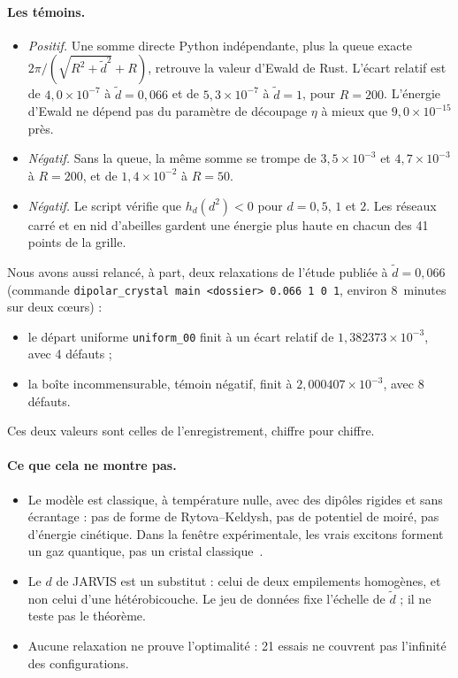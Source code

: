 \paragraph{Les témoins.}
\begin{itemize}
\item \emph{Positif.} Une somme directe Python indépendante, plus la queue exacte $2\pi/(\sqrt{R^2+\tilde
d^2}+R)$, retrouve la valeur d'Ewald de Rust. L'écart relatif est de $4{,}0\times10^{-7}$ à $\tilde d=0{,}066$ et
de $5{,}3\times10^{-7}$ à $\tilde d=1$, pour $R=200$. L'énergie d'Ewald ne dépend pas du paramètre de
découpage $\eta$ à mieux que $9{,}0\times10^{-15}$ près.
\item \emph{Négatif.} Sans la queue, la même somme se trompe de $3{,}5\times10^{-3}$ et $4{,}7\times10^{-3}$ à
$R=200$, et de $1{,}4\times10^{-2}$ à $R=50$.
\item \emph{Négatif.} Le script vérifie que $h_d(d^2)<0$ pour $d=0{,}5$, $1$ et $2$. Les réseaux carré et en nid
d'abeilles gardent une énergie plus haute en chacun des 41 points de la grille.
\end{itemize}
Nous avons aussi relancé, à part, deux relaxations de l'étude publiée à $\tilde d=0{,}066$ (commande
\texttt{dipolar\_crystal main <dossier> 0.066 1 0 1}, environ 8~minutes sur deux c\oe urs) :
\begin{itemize}
\item le départ uniforme \texttt{uniform\_00} finit à un écart relatif de $1{,}382373\times10^{-3}$, avec 4 défauts ;
\item la boîte incommensurable, témoin négatif, finit à $2{,}000407\times10^{-3}$, avec 8 défauts.
\end{itemize}
Ces deux valeurs sont celles de l'enregistrement, chiffre pour chiffre.

\paragraph{Ce que cela ne montre pas.}
\begin{itemize}
\item Le modèle est classique, à température nulle, avec des dipôles rigides et sans écrantage : pas de forme de
Rytova--Keldysh, pas de potentiel de moiré, pas d'énergie cinétique. Dans la fenêtre expérimentale, les vrais excitons
forment un gaz quantique, pas un cristal classique~\cite{ch5:wang}.
\item Le $d$ de JARVIS est un substitut : celui de deux empilements homogènes, et non celui d'une hétérobicouche. Le jeu
de données fixe l'échelle de $\tilde d$ ; il ne teste pas le théorème.
\item Aucune relaxation ne prouve l'optimalité : 21 essais ne couvrent pas l'infinité des configurations.
\end{itemize}

